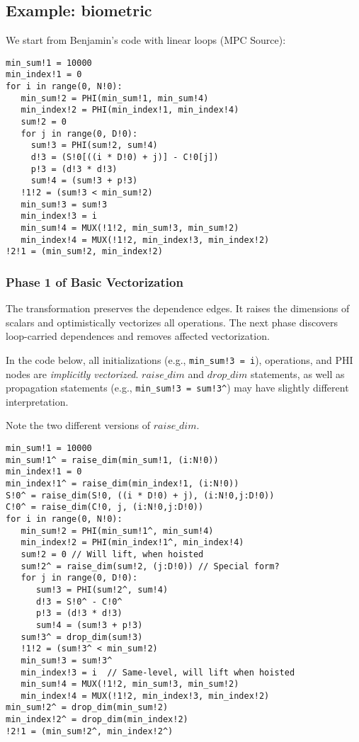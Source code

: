 
%

\subsection{Example: biometric}

We start from Benjamin's code with linear loops (MPC Source):

{\small
\begin{verbatim}
min_sum!1 = 10000
min_index!1 = 0
for i in range(0, N!0):
   min_sum!2 = PHI(min_sum!1, min_sum!4)
   min_index!2 = PHI(min_index!1, min_index!4)
   sum!2 = 0
   for j in range(0, D!0):
     sum!3 = PHI(sum!2, sum!4)
     d!3 = (S!0[((i * D!0) + j)] - C!0[j])
     p!3 = (d!3 * d!3)
     sum!4 = (sum!3 + p!3)
   !1!2 = (sum!3 < min_sum!2)
   min_sum!3 = sum!3
   min_index!3 = i
   min_sum!4 = MUX(!1!2, min_sum!3, min_sum!2)
   min_index!4 = MUX(!1!2, min_index!3, min_index!2)
!2!1 = (min_sum!2, min_index!2)   
\end{verbatim}
}

\subsubsection{Phase 1 of Basic Vectorization}

The transformation preserves the dependence edges. It raises the dimensions of scalars and optimistically vectorizes all operations. 
The next phase discovers loop-carried dependences and removes affected vectorization.

In the code below, all initializations (e.g., \texttt{min\_sum!3 = i}), operations, and PHI nodes are \emph{implicitly vectorized}. 
$\mathit{raise\_dim}$ and $\mathit{drop\_dim}$ statements, as well as propagation statements (e.g., \texttt{min\_sum!3 = sum!3\^}) 
may have slightly different interpretation. 

Note the two different versions of $\mathit{raise\_dim}$. 

{\small
\begin{verbatim}
min_sum!1 = 10000
min_sum!1^ = raise_dim(min_sum!1, (i:N!0))
min_index!1 = 0
min_index!1^ = raise_dim(min_index!1, (i:N!0))
S!0^ = raise_dim(S!0, ((i * D!0) + j), (i:N!0,j:D!0))
C!0^ = raise_dim(C!0, j, (i:N!0,j:D!0))
for i in range(0, N!0):
   min_sum!2 = PHI(min_sum!1^, min_sum!4)
   min_index!2 = PHI(min_index!1^, min_index!4) 
   sum!2 = 0 // Will lift, when hoisted
   sum!2^ = raise_dim(sum!2, (j:D!0)) // Special form?
   for j in range(0, D!0):
      sum!3 = PHI(sum!2^, sum!4)
      d!3 = S!0^ - C!0^
      p!3 = (d!3 * d!3) 
      sum!4 = (sum!3 + p!3)
   sum!3^ = drop_dim(sum!3)     
   !1!2 = (sum!3^ < min_sum!2)
   min_sum!3 = sum!3^
   min_index!3 = i  // Same-level, will lift when hoisted
   min_sum!4 = MUX(!1!2, min_sum!3, min_sum!2)
   min_index!4 = MUX(!1!2, min_index!3, min_index!2)
min_sum!2^ = drop_dim(min_sum!2)
min_index!2^ = drop_dim(min_index!2)   
!2!1 = (min_sum!2^, min_index!2^)     
\end{verbatim}
}

